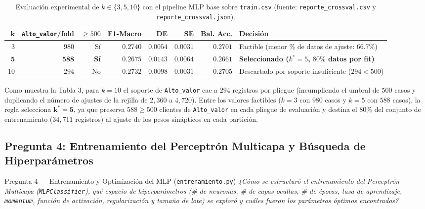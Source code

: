 \documentclass[11pt,a4paper]{article}
\newcommand{\code}[1]{\texttt{\small #1}}
\begin{document}
\begin{table}[H]
\centering
\caption{Evaluación experimental de $k \in \{3, 5, 10\}$ con el pipeline MLP base sobre \code{train.csv} (fuente: \code{reporte\_crossval.csv} y \code{reporte\_crossval.json}).}
\footnotesize
\setlength{\tabcolsep}{3.5pt}
\begin{tabularx}{\textwidth}{rrrrrrr >{\raggedright\arraybackslash}X}
\toprule
$\mathbf{k}$ & \textbf{\code{Alto\_valor}/fold} & \textbf{$\ge 500$} & \textbf{F1-Macro} & \textbf{DE} & \textbf{SE} & \textbf{Bal. Acc.} & \textbf{Decisión} \\
\midrule
$3$  & $980$ & Sí & $0.2740$ & $0.0054$ & $0.0031$ & $0.2701$ & Factible (menor \% de datos de ajuste: $66.7\%$) \\
$\mathbf{5}$  & $\mathbf{588}$ & \textbf{Sí} & $\mathbf{0.2675}$ & $\mathbf{0.0143}$ & $\mathbf{0.0064}$ & $\mathbf{0.2661}$ & \textbf{Seleccionado ($k^* = 5$, $80\%$ datos por fit)} \\
$10$ & $294$ & No & $0.2732$ & $0.0098$ & $0.0031$ & $0.2705$ & Descartado por soporte insuficiente ($294 < 500$) \\
\bottomrule
\end{tabularx}
\end{table}

Como muestra la Tabla 3, para $k = 10$ el soporte de \code{Alto\_valor} cae a $294$ registros por pliegue (incumpliendo el umbral de $500$ casos y duplicando el número de ajustes de la rejilla de $2{,}360$ a $4{,}720$). Entre los valores factibles ($k = 3$ con $980$ casos y $k = 5$ con $588$ casos), la regla selecciona $\mathbf{k^* = 5}$, ya que preserva $588 \ge 500$ clientes de \code{Alto\_valor} en cada pliegue de evaluación y destina el $80\%$ del conjunto de entrenamiento ($34{,}711$ registros) al ajuste de los pesos sinápticos en cada partición.

\subsection{Pregunta 4: Entrenamiento del Perceptrón Multicapa y Búsqueda de Hiperparámetros}

\begin{pregunta}{Pregunta 4 --- Entrenamiento y Optimización del MLP (\texttt{entrenamiento.py})}{}
\textit{¿Cómo se estructuró el entrenamiento del Perceptrón Multicapa (\texttt{MLPClassifier}), qué espacio de hiperparámetros (\# de neuronas, \# de capas ocultas, \# de épocas, tasa de aprendizaje, \texttt{momentum}, función de activación, regularización y tamaño de lote) se exploró y cuáles fueron los parámetros óptimos encontrados?}
\end{pregunta}
\end{document}
